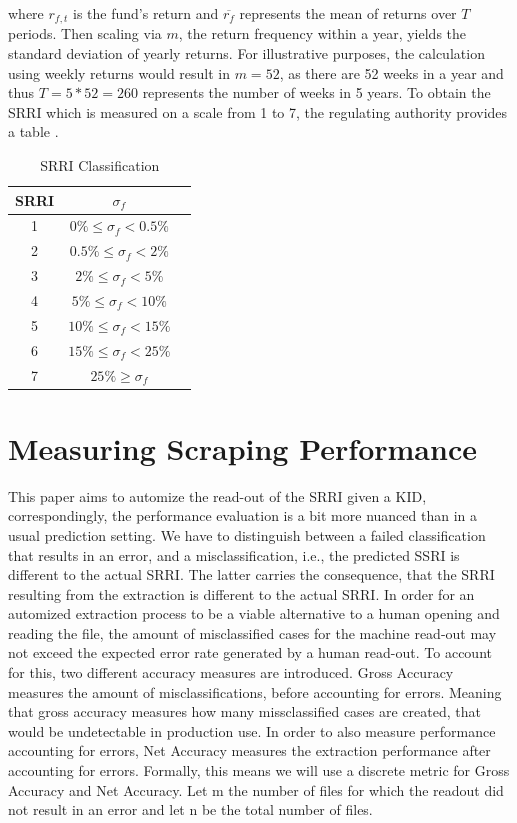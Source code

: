 \documentclass[aodsor,preprint]{imsart}
\numberwithin{equation}{section}
\theoremstyle{plain}
\begin{document}
where $r_{f, t}$ is the fund's return and $\overline{r_f}$ represents the mean of returns over $T$ periods. Then scaling via $m$, the return frequency within a year, yields the standard deviation of yearly returns. For illustrative purposes, the calculation using weekly returns would result in $m = 52$, as there are 52 weeks in a year and thus $T = 5 * 52 = 260$ represents the number of weeks in 5 years. To obtain the SRRI which is measured on a scale from 1 to 7, the regulating authority provides a table \citep{BGB1}.
\begin{table}[H]
\begin{center}
	\caption{SRRI Classification}
\begin{tabular}{|c|c|c}
	\hline
	SRRI & $\sigma_f$ \\
	\hline
	1 & $0\% \leq\sigma_f<0.5\%$\\
	\hline
	2 & $0.5\%\leq\sigma_f<2\%$\\
	\hline
	3 & $2\%\leq\sigma_f<5\%$\\
	\hline
	4 & $5\%\leq\sigma_f<10\%$\\
	\hline
	5 & $10\%\leq\sigma_f<15\%$\\
	\hline
	6 & $15\%\leq\sigma_f<25\%$\\
	\hline
	7 & $25\%\geq\sigma_f$\\
	\hline
\end{tabular}
\end{center}
\end{table}

\section{Measuring Scraping Performance}

This paper aims to automize the read-out of the SRRI given a KID, correspondingly, the performance evaluation is a bit more nuanced than in a usual prediction setting. We have to distinguish between a failed classification that results in an error, and a misclassification, i.e., the predicted SSRI is different to the actual SRRI. The latter carries the consequence, that the SRRI resulting from the extraction is different to the actual SRRI. In order for an automized extraction process to be a viable alternative to a human opening and reading the file, the amount of misclassified cases for the machine read-out may not exceed the expected error rate generated by a human read-out. To account for this, two different accuracy measures are introduced. Gross Accuracy measures the amount of misclassifications, before accounting for errors. Meaning that gross accuracy measures how many missclassified cases are created, that would be undetectable in production use. In order to also measure performance accounting for errors, Net Accuracy measures the extraction performance after accounting for errors. Formally, this means we will use a discrete metric for Gross Accuracy and Net Accuracy. Let m the number of files for which the readout did not result in an error and let n be the total number of files.
\end{document}
